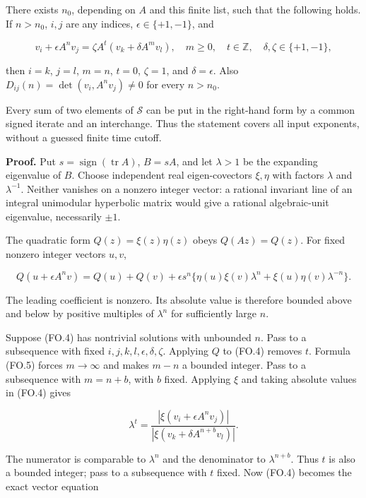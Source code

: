 \begin{lemma}\label{pass1:finite_orbit_resonance-2} There exists \(n_0\), depending on \(A\) and this finite list, such that the following holds. If \(n>n_0\), \(i,j\) are any indices, \(\epsilon\in\{+1,-1\}\), and
\end{lemma}

\[
 v_i+\epsilon A^n v_j
       =\zeta A^t(v_k+\delta A^m v_l),
 \quad m\ge0,\quad t\in\mathbb Z,
 \quad\delta,\zeta\in\{+1,-1\},
\tag{FO.4}
\]

then \(i=k\), \(j=l\), \(m=n\), \(t=0\), \(\zeta=1\), and \(\delta=\epsilon\). Also \(D_{ij}(n)=\det(v_i,A^n v_j)\ne0\) for every \(n>n_0\).

Every sum of two elements of \(\mathcal S\) can be put in the right-hand form by a common signed iterate and an interchange. Thus the statement covers all input exponents, without a guessed finite time cutoff.

\textbf{Proof.} Put \(s=\operatorname{sign}(\operatorname{tr}A)\), \(B=sA\), and let \(\lambda>1\) be the expanding eigenvalue of \(B\). Choose independent real eigen-covectors \(\xi,\eta\) with factors \(\lambda\) and \(\lambda^{-1}\). Neither vanishes on a nonzero integer vector: a rational invariant line of an integral unimodular hyperbolic matrix would give a rational algebraic-unit eigenvalue, necessarily \(\pm1\).

The quadratic form \(Q(z)=\xi(z)\eta(z)\) obeys \(Q(Az)=Q(z)\). For fixed nonzero integer vectors \(u,v\),

\[
 Q(u+\epsilon A^n v)=Q(u)+Q(v)+\epsilon s^n
    \{\eta(u)\xi(v)\lambda^n+\xi(u)\eta(v)\lambda^{-n}\}.
\tag{FO.5}
\]

The leading coefficient is nonzero. Its absolute value is therefore bounded above and below by positive multiples of \(\lambda^n\) for sufficiently large \(n\).

Suppose (FO.4) has nontrivial solutions with unbounded \(n\). Pass to a subsequence with fixed \(i,j,k,l,\epsilon,\delta,\zeta\). Applying \(Q\) to (FO.4) removes \(t\). Formula (FO.5) forces \(m\to\infty\) and makes \(m-n\) a bounded integer. Pass to a subsequence with \(m=n+b\), with \(b\) fixed. Applying \(\xi\) and taking absolute values in (FO.4) gives

\[
 \lambda^t=
 \frac{|\xi(v_i+\epsilon A^n v_j)|}
 {|\xi(v_k+\delta A^{n+b}v_l)|}.
\tag{FO.6}
\]

The numerator is comparable to \(\lambda^n\) and the denominator to \(\lambda^{n+b}\). Thus \(t\) is also a bounded integer; pass to a subsequence with \(t\) fixed. Now (FO.4) becomes the exact vector equation


